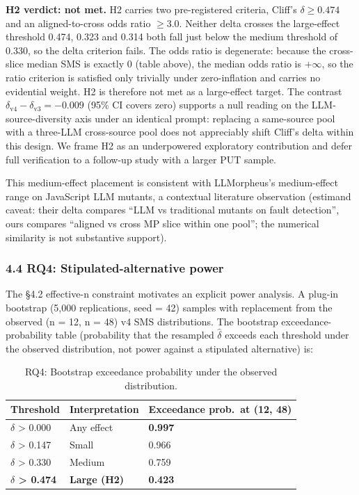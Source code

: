 \documentclass[review,12pt,authoryear]{elsarticle}
\begin{document}
\textbf{H2 verdict: not met.} H2 carries two pre-registered criteria,
Cliff's $\delta \geq 0.474$ and an aligned-to-cross odds ratio
$\geq 3.0$. Neither delta crosses the \citet{romano2006cliff}
large-effect threshold 0.474, 0.323 and 0.314 both fall just below the
\citet{romano2006cliff} medium threshold of 0.330, so the delta criterion fails. The
odds ratio is degenerate: because the cross-slice median SMS is exactly
0 (table above), the median odds ratio is $+\infty$, so the ratio
criterion is satisfied only trivially under zero-inflation and carries no
evidential weight. H2 is therefore not met as a large-effect target. The
contrast $\delta_{\mathrm{v4}} - \delta_{\mathrm{v3}} = -0.009$ (95\% CI covers
zero) supports a null reading on the LLM-source-diversity axis under an
identical prompt: replacing a same-source pool with a three-LLM
cross-source pool does not appreciably shift Cliff's delta within this
design. We frame H2 as an underpowered exploratory contribution and
defer full verification to a follow-up study with a larger PUT sample.

This medium-effect placement is consistent with \citet{tip2025llmorpheus}
LLMorpheus's medium-effect range on JavaScript LLM mutants, a contextual
literature observation (estimand caveat: their delta compares ``LLM vs
traditional mutants on fault detection'', ours compares ``aligned vs
cross MP slice within one pool''; the numerical similarity is not
substantive support).

\subsubsection{4.4 RQ4: Stipulated-alternative power}\label{rq2-stipulated-alternative-power}

The §4.2 effective-n constraint motivates an explicit power analysis. A
plug-in bootstrap (5,000 replications, seed = 42) samples with
replacement from the observed (n = 12, n = 48) v4 SMS distributions. The
bootstrap exceedance-probability table (probability that the resampled
$\hat\delta$ exceeds each threshold under the observed distribution, not
power against a stipulated alternative) is:

{\def\LTcaptype{table} %
\begin{longtable}[]{@{}lll@{}}
\caption{RQ4: Bootstrap exceedance probability under the observed
distribution.}\label{tab:p2-10}\\
\toprule\noalign{}
Threshold & Interpretation & Exceedance prob.\ at (12, 48) \\
\midrule\noalign{}
\endhead
\bottomrule\noalign{}
\endlastfoot
$\delta$ \textgreater{} 0.000 & Any effect & \textbf{0.997} \\
$\delta$ \textgreater{} 0.147 & Small & 0.966 \\
$\delta$ \textgreater{} 0.330 & Medium & 0.759 \\
\textbf{$\delta$ \textgreater{} 0.474} & \textbf{Large (H2)} &
\textbf{0.423} \\
\end{longtable}
}
\end{document}
